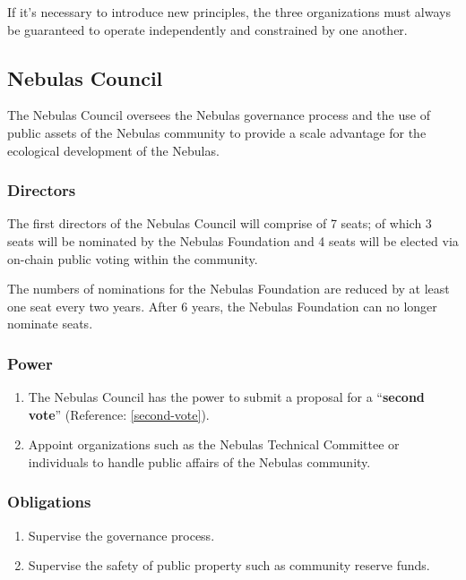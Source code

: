 If it’s necessary to introduce new principles, the three organizations must always be guaranteed to operate independently and constrained by one another.

\subsection{Nebulas Council}

The Nebulas Council oversees the Nebulas governance process and the use of public assets of the Nebulas community to provide a scale advantage for the ecological development of the Nebulas.

\subsubsection{Directors}

The first directors of the Nebulas Council will comprise of 7 seats; of which 3 seats will be nominated by the Nebulas Foundation and 4 seats will be elected via on-chain public voting within the community.

The numbers of nominations for the Nebulas Foundation are reduced by at least one seat every two years. After 6 years, the Nebulas Foundation can no longer nominate seats.

\subsubsection{Power}

\begin{enumerate}
	\item The Nebulas Council has the power to submit a proposal for a “\textbf{second vote}” (Reference: \ref{second-vote}).
	\item Appoint organizations such as the Nebulas Technical Committee or individuals to handle public affairs of the Nebulas community.
\end{enumerate}

\subsubsection{Obligations}

\begin{enumerate}
	\item Supervise the governance process.
	\item Supervise the safety of public property such as community reserve funds.
\end{enumerate}

